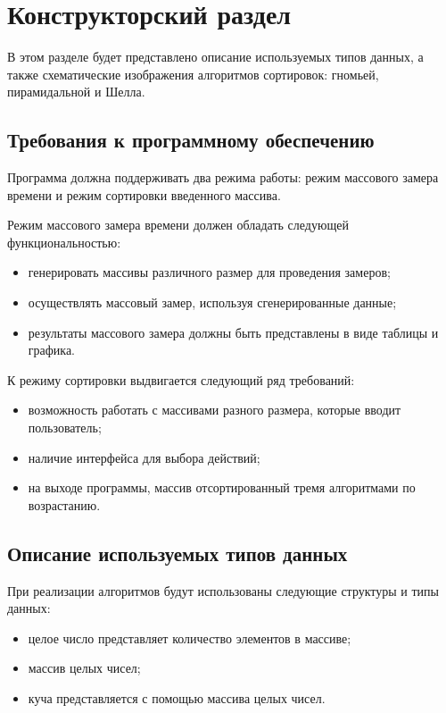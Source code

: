 \chapter{Конструкторский раздел}

В этом разделе будет представлено описание используемых типов данных, а также схематические изображения алгоритмов сортировок: гномьей, пирамидальной и Шелла.

\section{Требования к программному обеспечению}

Программа должна поддерживать два режима работы: режим массового замера времени и режим сортировки введенного массива.

Режим массового замера времени должен обладать следующей функциональностью:
\begin{itemize}
	\item генерировать массивы различного размер для проведения замеров;
	\item осуществлять массовый замер, используя сгенерированные данные;
	\item результаты массового замера должны быть представлены в виде таблицы и графика.
\end{itemize}

К режиму сортировки выдвигается следующий ряд требований:
\begin{itemize}
	\item возможность работать с массивами разного размера, которые вводит пользователь;
	\item наличие интерфейса для выбора действий;
	\item на выходе программы, массив отсортированный тремя алгоритмами по возрастанию.
\end{itemize}

\section{Описание используемых типов данных}

При реализации алгоритмов будут использованы следующие структуры и типы данных:
\begin{itemize}
	\item целое число представляет количество элементов в массиве;
	\item массив целых чисел;
	\item куча представляется с помощью массива целых чисел.
\end{itemize}

